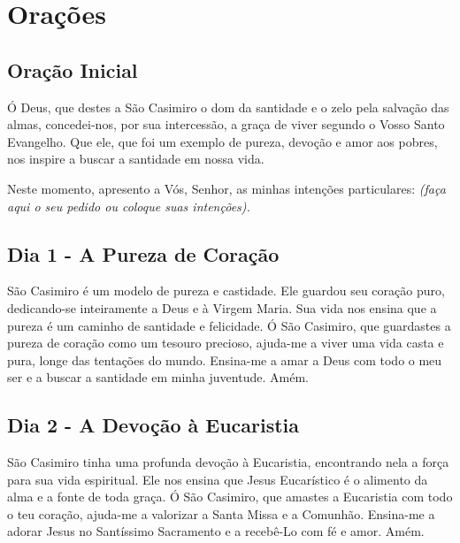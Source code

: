 \documentclass[a4paper,14pt]{extarticle} \usepackage[utf8]{inputenc}
\begin{document}
\newpage

\vfill

\section{Orações}
\subsection{Oração Inicial}\label{sub:inicial} %

Ó Deus, que destes a São Casimiro o dom da santidade e o zelo pela salvação das almas, concedei-nos, por sua intercessão, a graça de viver segundo o Vosso Santo Evangelho. Que ele, que foi um exemplo de pureza, devoção e amor aos pobres, nos inspire a buscar a santidade em nossa vida.

Neste momento, apresento a Vós, Senhor, as minhas intenções particulares:
\textit{(faça aqui o seu pedido ou coloque suas intenções).}

\subsection{Dia 1 - A Pureza de Coração}

\underline{}

São Casimiro é um modelo de pureza e castidade. Ele guardou seu coração puro, dedicando-se inteiramente a Deus e à Virgem Maria. Sua vida nos ensina que a pureza é um caminho de santidade e felicidade.
Ó São Casimiro, que guardastes a pureza de coração como um tesouro precioso, ajuda-me a viver uma vida casta e pura, longe das tentações do mundo. Ensina-me a amar a Deus com todo o meu ser e a buscar a santidade em minha juventude. Amém.


\underline{}

\subsection{Dia 2 - A Devoção à Eucaristia}

\underline{}

São Casimiro tinha uma profunda devoção à Eucaristia, encontrando nela a força para sua vida espiritual. Ele nos ensina que Jesus Eucarístico é o alimento da alma e a fonte de toda graça.
Ó São Casimiro, que amastes a Eucaristia com todo o teu coração, ajuda-me a valorizar a Santa Missa e a Comunhão. Ensina-me a adorar Jesus no Santíssimo Sacramento e a recebê-Lo com fé e amor. Amém.
\end{document}
